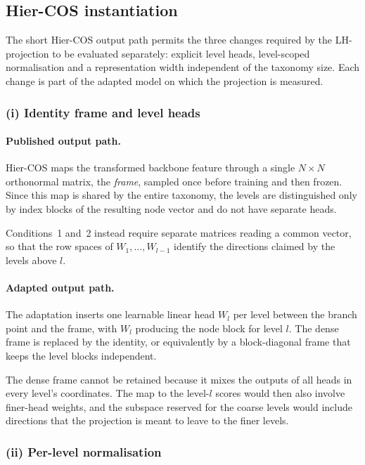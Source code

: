 \subsection{Hier-COS instantiation}
\label{ssec:lhproj_hiercos}

The short Hier-COS output path permits the three changes required by the
LH-projection to be evaluated separately: explicit level heads, level-scoped
normalisation and a representation width independent of the taxonomy size.
Each change is part of the adapted model on which the projection is measured.

\subsubsection{(i) Identity frame and level heads}

\paragraph{Published output path.}
Hier-COS maps the transformed backbone feature through a single $N\times N$
orthonormal matrix, the \emph{frame}, sampled once before training and then
frozen. Since this map is shared by the entire taxonomy, the levels are
distinguished only by index blocks of the resulting node vector and do not have
separate heads.

Conditions~1 and~2 instead require separate matrices reading a common vector,
so that the row spaces of $W_1,\dots,W_{l-1}$ identify the directions claimed
by the levels above $l$.

\paragraph{Adapted output path.}
The adaptation inserts one learnable linear head $W_l$ per level between the
branch point and the frame, with $W_l$ producing the node block for level $l$.
The dense frame is replaced by the identity, or equivalently by a block-diagonal
frame that keeps the level blocks independent.

The dense frame cannot be retained because it mixes the outputs of all heads in
every level's coordinates. The map to the level-$l$ scores would then also
involve finer-head weights, and the subspace reserved for the coarse levels
would include directions that the projection is meant to leave to the finer
levels.

\subsubsection{(ii) Per-level normalisation}

